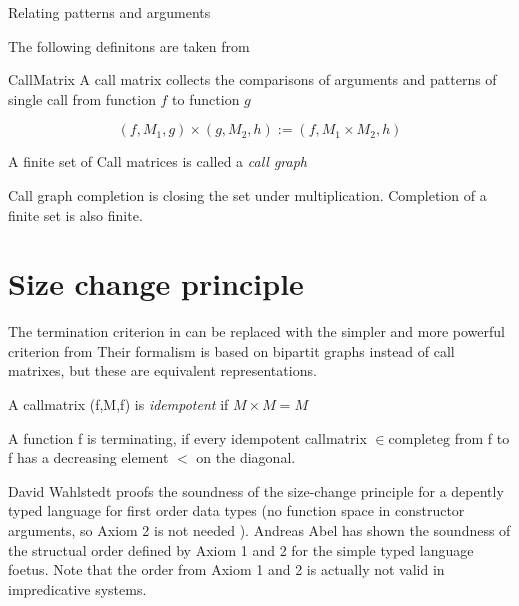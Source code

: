 \begin{definition}{Relating patterns and arguments}
\end{definition}

The following definitons are taken from \cite{abelAltenkirch:predStRec}

\begin{definition}
CallMatrix
A call matrix collects the comparisons of arguments and patterns of single call from function $f$ to function $g$
\end{definition}

\begin{definition}

\[(f,M_1,g) \times (g,M_2,h) := (f,M_1 \times M_2,h)\]
\end{definition}

\begin{definition}
A finite set of Call matrices is called a \emph{call graph}
\end{definition}

\begin{definition}
Call graph completion is closing the set under multiplication.
Completion of a finite set is also finite. 
\end{definition}

\section{Size change principle}

The termination criterion in \cite{abelAltenkirch:predStRec} can be replaced with the
simpler and more powerful criterion from \cite{lee01sizechange}
Their formalism is based on bipartit graphs instead of call matrixes, but these are
equivalent representations.

\begin{definition}
A callmatrix (f,M,f) is \emph{idempotent} if $ M \times M = M $ 
\end{definition}

\begin{definition}
A function f is terminating, if every idempotent callmatrix  $ \in \mathrm{complete g} $ from f to f has a decreasing element $<$ on
the diagonal.
\end{definition}

David Wahlstedt proofs the soundness of the size-change principle for a depently typed language 
for first order data types (no function space in constructor arguments, so Axiom 2 is not needed ).
Andreas Abel has shown the soundness of the structual order defined by Axiom 1 and 2 for the simple typed
language foetus.
Note that the order from Axiom 1 and 2 is actually not valid in impredicative systems.

